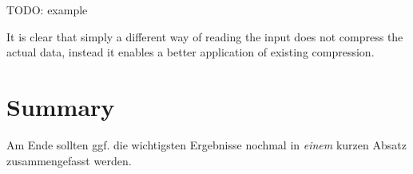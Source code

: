 TODO: example

\par{
It is clear that simply a different way of reading the input does not compress the actual data, instead it enables a better application of existing compression.
}


\section{Summary}
\label{ch:Analyse:sec:Summary}

Am Ende sollten ggf. die wichtigsten Ergebnisse nochmal in \emph{einem}
kurzen Absatz zusammengefasst werden.

